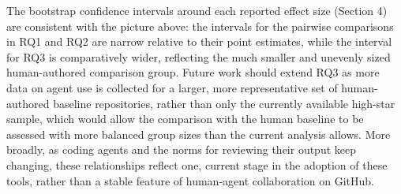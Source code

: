 The bootstrap confidence intervals around each reported effect size (Section 4) are consistent with the picture above: the intervals for the pairwise comparisons in RQ1 and RQ2 are narrow relative to their point estimates, while the interval for RQ3 is comparatively wider, reflecting the much smaller and unevenly sized human-authored comparison group. Future work should extend RQ3 as more data on agent use is collected for a larger, more representative set of human-authored baseline repositories, rather than only the currently available high-star sample, which would allow the comparison with the human baseline to be assessed with more balanced group sizes than the current analysis allows. More broadly, as coding agents and the norms for reviewing their output keep changing, these relationships reflect one, current stage in the adoption of these tools, rather than a stable feature of human-agent collaboration on GitHub.
